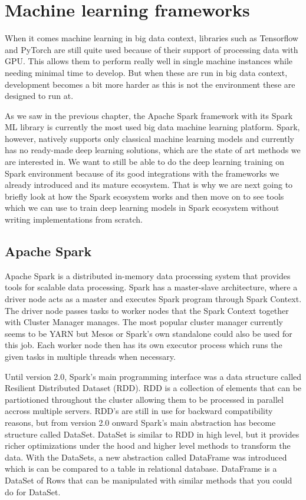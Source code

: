 \section{Machine learning frameworks}

When it comes machine learning in big data context, libraries such as Tensorflow and PyTorch are still quite used because of their support of processing data with GPU.
This allows them to perform really well in single machine instances while needing minimal time to develop.
But when these are run in big data context, development becomes a bit more harder as this is not the environment these are designed to run at.

As we saw in the previous chapter, the Apache Spark framework with its Spark ML library is currently the most used big data machine learning platform.
Spark, however, natively supports only classical machine learning models and currently has no ready-made deep learning solutions, which are the state of art methods we are interested in.
We want to still be able to do the deep learning training on Spark environment because of its good integrations with the frameworks we already introduced and its mature ecosystem.
That is why we are next going to briefly look at how the Spark ecosystem works and then move on to see tools which we can use to train deep learning models in Spark ecosystem without writing implementations from scratch.


\subsection{Apache Spark}

Apache Spark is a distributed in-memory data processing system that provides tools for scalable data processing.
Spark has a master-slave architecture, where a driver node acts as a master and executes Spark program through Spark Context.
The driver node passes tasks to worker nodes that the Spark Context together with Cluster Manager manages.
The most popular cluster manager currently seems to be YARN but Mesos or Spark's own standalone could also be used for this job. 
Each worker node then has its own executor process which runs the given tasks in multiple threads when necessary.\cite{spark}

Until version 2.0, Spark's main programming interface was a data structure called Resilient Distributed Dataset (RDD).
RDD is a collection of elements that can be partiotioned throughout the cluster allowing them to be processed in parallel accross multiple servers.
RDD's are still in use for backward compatibility reasons, but from version 2.0 onward Spark's main abstraction has become structure called DataSet.
DataSet is similar to RDD in high level, but it provides richer optimizations under the hood and higher level methods to transform the data.
With the DataSets, a new abstraction called DataFrame was introduced which is can be compared to a table in relational database.
DataFrame is a DataSet of Rows that can be manipulated with similar methods that you could do for DataSet.\cite{spark}

